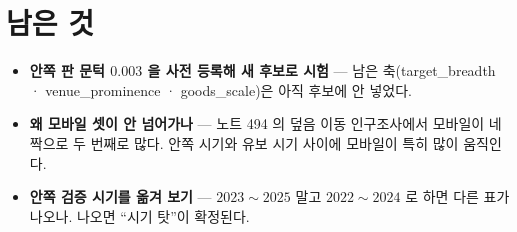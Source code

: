 \documentclass[11pt]{article}
\begin{document}
\section*{남은 것}

\begin{itemize}
\item \textbf{안쪽 판 문턱 $0.003$ 을 사전 등록해 새 후보로 시험} ---
남은 축(target\_breadth · venue\_prominence · goods\_scale)은 아직 후보에
안 넣었다.
\item \textbf{왜 모바일 셋이 안 넘어가나} --- 노트 494 의 덮음 이동
인구조사에서 모바일이 네 짝으로 두 번째로 많다. 안쪽 시기와 유보 시기
사이에 모바일이 특히 많이 움직인다.
\item \textbf{안쪽 검증 시기를 옮겨 보기} --- $2023\!\sim\!2025$ 말고
$2022\!\sim\!2024$ 로 하면 다른 표가 나오나. 나오면 ``시기 탓''이 확정된다.
\end{itemize}
\end{document}
